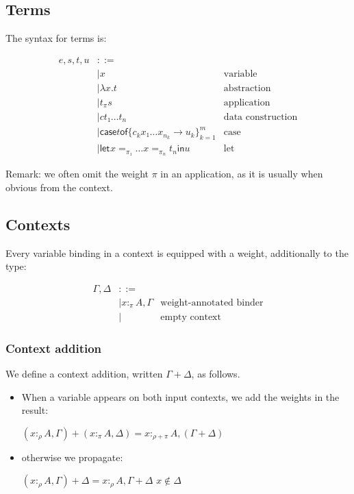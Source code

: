 \documentclass[11pt]{article}
\newcommand{\case}[2]{\mathsf{case} #1 \mathsf{of} \{#2\}^m_{k=1}}
\newcommand{\flet}[1][]{\mathsf{let}_{#1} }
\newcommand{\fin}{ \mathsf{in} }
\begin{document}
\subsection{Terms}
\label{sec:orgheadline3}

The syntax for terms is:

\begin{align*}
e,s,t,u & ::= \\
    & |  x & \text{variable} \\
    & |  λx. t & \text{abstraction} \\
    & |  t_π s & \text{application} \\
    & |  c t₁ … t_n & \text{data construction} \\
    & |  \case t {c_k  x₁ … x_{n_k} → u_k}  & \text{case} \\
    & |  \flet x =_{π₁} … x =_{π_n} t_n \fin u & \text{let}
\end{align*}

Remark: we often omit the weight $π$ in an application, as it is
usually when obvious from the context.

\subsection{Contexts}
\label{sec:orgheadline6}

Every variable binding in a context is equipped with a weight,
additionally to the type:

\begin{align*}
  Γ,Δ & ::=\\
    & |  x :_π A, Γ & \text{weight-annotated binder} \\
    & |     & \text {empty context}
\end{align*}

\subsubsection{Context addition}
\label{sec:orgheadline4}

We define a context addition, written \(Γ+Δ\), as follows.

\begin{itemize}
\item When a variable appears on both input contexts, we add the weights in
the result:

\((x :_ρ A,Γ) + (x :_π A,Δ) = x :_{ρ+π} A, (Γ+Δ)\)

\item otherwise we propagate:

\((x :_ρ A,Γ) + Δ = x :_ρ A, Γ+Δ\)   \hfill   \(x ∉ Δ\)
\end{itemize}
\end{document}
